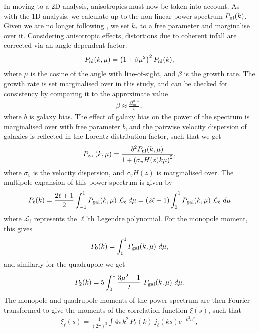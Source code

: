 \documentclass[titlesmallcaps, examinerscopy, copyrightpage]{uqthesis}
\begin{document}
In moving to a 2D analysis, anisotropies must now be taken into account. As with the 1D analysis, we calculate up to the non-linear power spectrum $P_{\rm{nl}}(k)$. Given we are no longer following \citet{BlakeDavis2011}, we set $k_*$ to a free parameter and marginalise over it. Considering anisotropic effects, distortions due to coherent infall are corrected via an angle dependent factor:
\begin{align}
P_{\rm{nl}}(k, \mu) = \left(1 + \beta \mu^2\right)^2 P_{\text{nl}}(k),
\end{align}
where $\mu$ is the cosine of the angle with line-of-sight, and $\beta$ is the growth rate. The growth rate is set marginalised over in this study, and can be checked for consistency by comparing it to the approximate value
\begin{align}
\beta \approx \frac{\Omega_m^{0.55}}{b},
\end{align}
where $b$ is galaxy bias. The effect of galaxy bias on the power of the spectrum is marginalised over with free parameter $b$, and the pairwise velocity dispersion of galaxies is reflected in the Lorentz distribution factor, such that we get
\begin{align}
P_{\rm{gal}}(k, \mu) = \frac{b^2 P_{\rm{nl}}(k, \mu)}{1 + \left(\sigma_v H(z) k \mu\right)^2},
\end{align} 
where $\sigma_v$ is the velocity dispersion, and $\sigma_v H(z)$ is marginalised over. The multipole expansion of this power spectrum is given by
\begin{align}
P_{\ell}(k) = \frac{2\ell + 1}{2} \int_{-1}^1 P_{\rm{gal}}(k, \mu) \ \mathcal{L}_\ell \  d\mu = (2\ell + 1) \int_{0}^1 P_{\rm{gal}}(k, \mu) \ \mathcal{L}_\ell \  d\mu
\end{align}
where $\mathcal{L}_\ell$ represents the $\ell$'th Legendre polynomial. For the monopole moment, this gives
\begin{align}
P_0(k) = \int_0^1 P_{\rm{gal}}(k, \mu) \  d\mu,
\end{align}
 and similarly for the quadrupole we get
\begin{align}
P_2(k) = 5 \int_0^1 \frac{3\mu^2 - 1}{2}\  P_{\rm{gal}}(k, \mu)\  d\mu.
\end{align}
The monopole and quadrupole moments of the power spectrum are then Fourier transformed to give the moments of the correlation function $\xi(s)$, such that
\begin{align}
\xi_\ell(s) = \frac{1}{(2\pi)^3} \int 4\pi k^2 \ P_\ell(k) \ j_\ell(ks) e^{-k^2 a^2},
\end{align}
\end{document}
